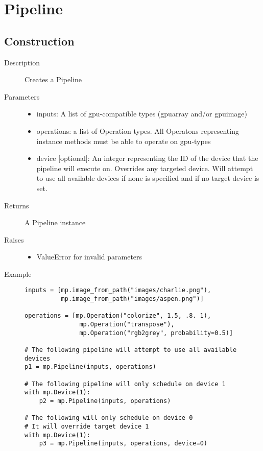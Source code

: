 
\section{Pipeline}

\subsection{Construction}

\begin{description}
   \item[Description] Creates a Pipeline
   \item[Parameters] \phantom{}
   \begin{itemize}
       \item inputs: A list of gpu-compatible types (gpuarray and/or gpuimage)
       \item operations: a list of Operation types. All Operatons representing instance methods must be able to operate on gpu-types
       \item device [optional]:  An integer representing the ID of the device that the pipeline will execute on. Overrides any targeted device. Will attempt to use all available devices if none is specified and if no target device is set.
   \end{itemize}
   \item[Returns] A Pipeline instance
   \item[Raises] \phantom{}
   \begin{itemize}
       \item ValueError for invalid parameters
   \end{itemize}
   \item[Example] \phantom{}
   \begin{lstlisting}
inputs = [mp.image_from_path("images/charlie.png"),
          mp.image_from_path("images/aspen.png")]

operations = [mp.Operation("colorize", 1.5, .8. 1),
               mp.Operation("transpose"),
               mp.Operation("rgb2grey", probability=0.5)]

# The following pipeline will attempt to use all available devices
p1 = mp.Pipeline(inputs, operations)

# The following pipeline will only schedule on device 1
with mp.Device(1):
    p2 = mp.Pipeline(inputs, operations)

# The following will only schedule on device 0
# It will override target device 1
with mp.Device(1):
    p3 = mp.Pipeline(inputs, operations, device=0)

\end{lstlisting}
\end{description}

